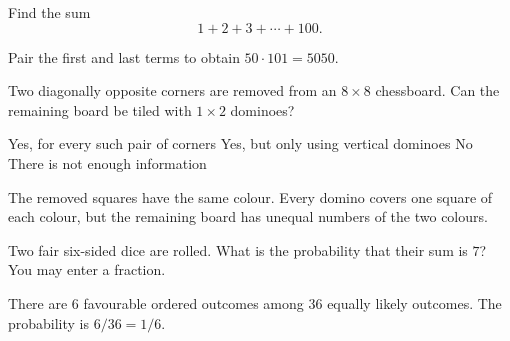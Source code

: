 \documentclass{article}
\begin{document}
\begin{problem}[points=3]
Find the sum
\[1+2+3+\cdots+100.\]
\begin{solution}
Pair the first and last terms to obtain $50\cdot101=5050$.
\end{solution}
\end{problem}

\begin{problem}[points=2]
Two diagonally opposite corners are removed from an $8\times8$ chessboard.
Can the remaining board be tiled with $1\times2$ dominoes?
\begin{choices}
\choice Yes, for every such pair of corners
\choice Yes, but only using vertical dominoes
\correctchoice No
\choice There is not enough information
\end{choices}
\begin{solution}
The removed squares have the same colour. Every domino covers one square of each colour, but the remaining board has unequal numbers of the two colours.
\end{solution}
\end{problem}

\begin{problem}[points=3,tolerance=0.000001]
Two fair six-sided dice are rolled. What is the probability that their sum is $7$?
You may enter a fraction.
\begin{solution}
There are $6$ favourable ordered outcomes among $36$ equally likely outcomes. The probability is $6/36=1/6$.
\end{solution}
\end{problem}
\end{document}
